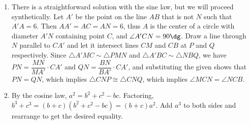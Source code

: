 \documentclass[10pt,paper=letter]{scrartcl}
\begin{document}
\begin{enumerate}
\item There is a straightforward solution with the sine law, but we will proceed synthetically. Let $A'$ be the point on the line $AB$ that is not $N$ such that $A'A = 6$. Then $AA' = AC = AN = 6$, thus $A$ is the center of a circle with diameter $A'N$ containing point $C$, and $\angle A'CN = 90\dg$. Draw a line through $N$ parallel to $CA'$ and let it intersect lines $CM$ and $CB$ at $P$ and $Q$ respectively. Since $\triangle A'MC \sim \triangle PMN$ and $\triangle A'BC \sim \triangle NBQ$, we have $PN = \dfrac{MN}{MA'} \cdot CA'$ and $QN = \dfrac{BN}{BA'} \cdot CA'$, and substituting the given shows that $PN = QN$, which implies $\triangle CNP \cong \triangle CNQ$, which implies $\angle MCN = \angle NCB$.

\item By the cosine law, $a^2 = b^2 + c^2 - bc$. Factoring, $b^3 + c^3 = (b + c)(b^2 + c^2 - bc) = (b + c)a^2$. Add $a^3$ to both sides and rearrange to get the desired equality.

\end{enumerate}
\end{document}
